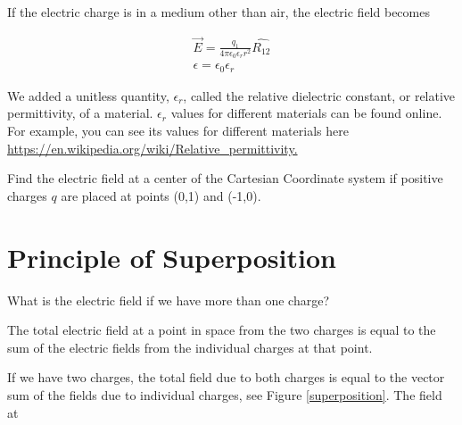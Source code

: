 \documentclass{ximera}
\begin{document}
If the electric charge is in a medium other than air, the electric field becomes


\begin{eqnarray}
\vec{E}=\frac{q_1 }{4 \pi \epsilon_0 \epsilon_r r^2} \hat{R_{12}} \\
\epsilon = \epsilon_0 \epsilon_r
\end{eqnarray}\label{Coulombslaw3}

We added a unitless quantity, $\epsilon_r$, called the relative dielectric constant, or relative permittivity, of a material. $\epsilon_r$ values for different materials can be found online. For example, you can see its values for different materials here  \url{https://en.wikipedia.org/wiki/Relative_permittivity.}




\begin{problem}
   Find the electric field at a center of the Cartesian Coordinate system if positive charges $q$ are placed at points (0,1) and (-1,0).
   \begin{prompt}
   \begin{multipleChoice}
   \end{multipleChoice}
   \end{prompt}
   \end{problem}





\section{Principle of Superposition}




What is the electric field if we have more than one charge?

The total electric field at a point in space from the two charges is equal to the sum of the electric fields from the individual charges at that point.

If we have two charges, the total field due to both charges is equal to the vector sum of the fields due to individual charges, see Figure \ref{superposition}.  The field at
\end{document}
